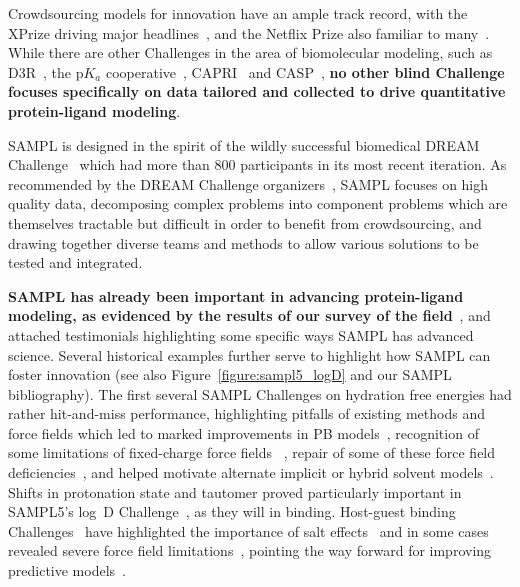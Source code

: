 \documentclass[11pt]{article}
\begin{document}
Crowdsourcing models for innovation have an ample track record, with the XPrize driving major headlines~\cite{::XPRIZE, Kay:2011:R&DManage, XPrize:2017:Wikipedia}, and the Netflix Prize also familiar to many~\cite{Bell:2010:CHANCE}. 
While there are other Challenges in the area of biomolecular modeling, such as D3R~\cite{Gathiaka:2016:JComputAidedMolDes}, the p$K_a$ cooperative~\cite{Nielsen:2011:Proteins}, CAPRI~\cite{Janin:2005:ProteinScience} and CASP~\cite{Moult:2014:Proteins},
\textbf{no other blind Challenge focuses specifically on data tailored and collected to drive quantitative protein-ligand modeling}.

SAMPL is designed in the spirit of the wildly successful biomedical DREAM Challenge~\cite{Prill:2011:Sci.Signal., Eisenstein:2013:NatBiotech, Saez-Rodriguez:2016:NatRevGenet} which had more than 800 participants in its most recent iteration. 
As recommended by the DREAM Challenge organizers~\cite{Saez-Rodriguez:2016:NatRevGenet}, SAMPL focuses on high quality data, decomposing complex problems into component problems which are themselves tractable but difficult in order to benefit from crowdsourcing, and drawing together diverse teams and methods to allow various solutions to be tested and integrated.

\textbf{SAMPL has already been important in advancing protein-ligand modeling, as evidenced by the results of our survey of the field}~\cite{Mobley:2017:eScholarship}, and attached testimonials highlighting some specific ways SAMPL has advanced science.
Several historical examples further serve to highlight how SAMPL can foster innovation (see also Figure~\ref{figure:sampl5_logD} and our SAMPL bibliography). 
The first several SAMPL Challenges on hydration free energies had rather hit-and-miss performance, highlighting pitfalls of existing methods and force fields which led to marked improvements in PB models~\cite{nicholls_samp1_2009, ellingson_analysis_2010,ellingson_efficient_2014}, recognition of some limitations of fixed-charge force fields ~\cite{mobley_alchemical_2012, Fennell:2014:J.Phys.Chem.B},
repair of some of these force field deficiencies~\cite{mobley_alchemical_2012, Fennell:2014:J.Phys.Chem.B, paranahewage_predicting_2016},
and helped motivate alternate implicit or hybrid solvent models~\cite{sulea_predicting_2011, li_testing_2014, brini_adapting_2016}.
Shifts in protonation state and tautomer proved particularly important in SAMPL5's log~D Challenge~\cite{Bannan:2016:JComputAidedMolDes, klamt_prediction_2016}, as they will in binding.
Host-guest binding Challenges~\cite{Mobley:2017:AnnualReviewofBiophysics}
have highlighted the importance of salt effects~\cite{yin_overview_2016, muddana_blind_2014, Mobley:2017:AnnualReviewofBiophysics}
and in some cases revealed severe force field limitations~\cite{yin_sampl5_2016, muddana_sampl4_2014-1}, pointing the way forward for improving predictive models~\cite{yin_toward_2015, Mobley:2017:AnnualReviewofBiophysics}.
\end{document}

